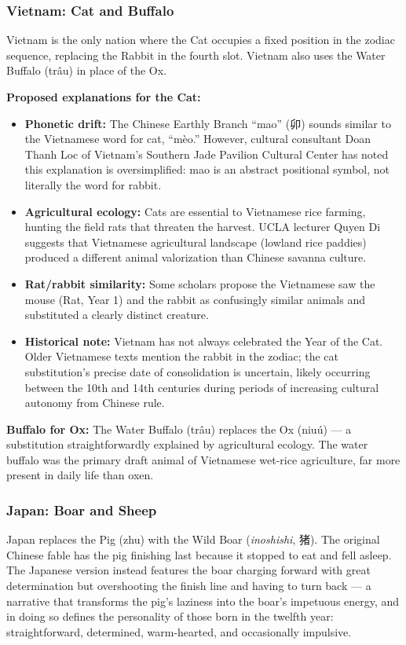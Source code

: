 \documentclass[11pt,letterpaper]{article}
\begin{document}
\subsubsection{Vietnam: Cat and Buffalo}

Vietnam is the only nation where the Cat occupies a fixed position in the zodiac sequence, replacing the Rabbit in the fourth slot. Vietnam also uses the Water Buffalo (tr\^{a}u) in place of the Ox.

\textbf{Proposed explanations for the Cat:}
\begin{itemize}[leftmargin=2em]
  \item \textbf{Phonetic drift:} The Chinese Earthly Branch ``mao'' (卯) sounds similar to the Vietnamese word for cat, ``m\`eo.'' However, cultural consultant Doan Thanh Loc of Vietnam's Southern Jade Pavilion Cultural Center has noted this explanation is oversimplified: mao is an abstract positional symbol, not literally the word for rabbit.
  \item \textbf{Agricultural ecology:} Cats are essential to Vietnamese rice farming, hunting the field rats that threaten the harvest. UCLA lecturer Quyen Di suggests that Vietnamese agricultural landscape (lowland rice paddies) produced a different animal valorization than Chinese savanna culture.
  \item \textbf{Rat/rabbit similarity:} Some scholars propose the Vietnamese saw the mouse (Rat, Year 1) and the rabbit as confusingly similar animals and substituted a clearly distinct creature.
  \item \textbf{Historical note:} Vietnam has not always celebrated the Year of the Cat. Older Vietnamese texts mention the rabbit in the zodiac; the cat substitution's precise date of consolidation is uncertain, likely occurring between the 10th and 14th centuries during periods of increasing cultural autonomy from Chinese rule.
\end{itemize}

\textbf{Buffalo for Ox:} The Water Buffalo (tr\^{a}u) replaces the Ox (niu\'{u}) --- a substitution straightforwardly explained by agricultural ecology. The water buffalo was the primary draft animal of Vietnamese wet-rice agriculture, far more present in daily life than oxen.

\subsubsection{Japan: Boar and Sheep}

Japan replaces the Pig (zhu) with the Wild Boar (\textit{inoshishi}, 猪). The original Chinese fable has the pig finishing last because it stopped to eat and fell asleep. The Japanese version instead features the boar charging forward with great determination but overshooting the finish line and having to turn back --- a narrative that transforms the pig's laziness into the boar's impetuous energy, and in doing so defines the personality of those born in the twelfth year: straightforward, determined, warm-hearted, and occasionally impulsive.
\end{document}
